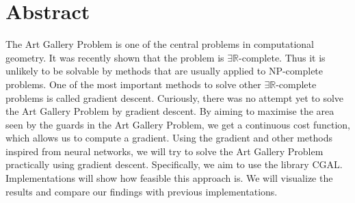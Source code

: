 \section*{Abstract}


The Art Gallery Problem is one of the central problems in computational geometry. It was recently shown that the problem is $\exists \mathbb{R}$-complete. Thus it is unlikely to be solvable by methods that are usually applied to NP-complete problems. One of the most important methods to solve other $\exists \mathbb{R}$-complete problems is called gradient descent. Curiously, there was no attempt yet to solve the Art Gallery Problem by gradient descent. By aiming to maximise the area seen by the guards in the Art Gallery Problem, we get a continuous cost function, which allows us to compute a gradient. Using the gradient and other methods inspired from neural networks, we will try to solve the Art Gallery Problem practically using gradient descent. Specifically, we aim to use the library CGAL. 
Implementations will show how feasible this approach is. We will visualize the results and compare our findings with previous implementations.